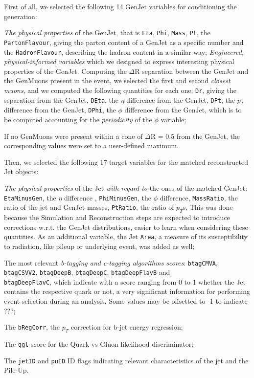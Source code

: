 First of all, we selected the following 14 GenJet variables for conditioning the generation: 

\begin{outline}
\1 \emph{The physical properties} of the GenJet, that is \texttt{Eta}, \texttt{Phi}, \texttt{Mass}, \texttt{Pt}, the \texttt{PartonFlavour}, giving the parton content of a GenJet as a specific number and the \texttt{HadronFlavour}, describing the hadron content in a similar way;
\1 \emph{Engineered, physical-informed variables} which we designed to express interesting physical properties of the GenJet. Computing the $\Delta$R separation between the GenJet and the GenMuons present in the event, we selected the first and second \emph{closest muons}, and we computed the following quantities for each one:
\2 \texttt{Dr}, giving the separation from the GenJet, \texttt{DEta}, the $\eta$ difference from the GenJet, \texttt{DPt}, the $p_T$ difference from the GenJet, \texttt{DPhi}, the $\phi$ difference from the GenJet, which is to be computed accounting for the \emph{periodicity} of the $\phi$ variable;

\1 If no GenMuons were present within a cone of $\Delta$R = 0.5 from the GenJet, the corresponding values were set to a user-defined maximum.

\end{outline}

Then, we selected the following 17 target variables for the matched reconstructed Jet objects:

\begin{outline}
\1 \emph{The physical properties} of the Jet \emph{with regard to} the ones of the matched GenJet: \texttt{EtaMinusGen}, the $\eta$ difference , \texttt{PhiMinusGen}, the $\phi$ difference, \texttt{MassRatio}, the ratio of the jet and GenJet masses, \texttt{PtRatio}, the ratio of $p_T$s. This was done because the Simulation and Reconstruction steps are expected to introduce corrections w.r.t. the GenJet distributions, easier to learn when considering these quantities. As an additional variable, the Jet \texttt{Area}, a measure of its susceptibility to radiation, like pileup or underlying event, was added as well;

\1 The most relevant \emph{b-tagging and c-tagging algorithms scores}: \texttt{btagCMVA}, \texttt{btagCSVV2}, \texttt{btagDeepB}, \texttt{btagDeepC}, \texttt{btagDeepFlavB} and \\\texttt{btagDeepFlavC}, which indicate with a score ranging from 0 to 1 whether the Jet contains the respective quark or not, a very significant information for performing event selection during an analysis. Some values may be offsetted to -1 to indicate ???;

\1 The \texttt{bRegCorr}, the $p_T$ correction for b-jet energy regression;

\1 The \texttt{qgl} score for the Quark vs Gluon likelihood discriminator;

\1 The \texttt{jetID} and \texttt{puID} ID flags indicating relevant characteristics of the jet and the Pile-Up.
\end{outline}
